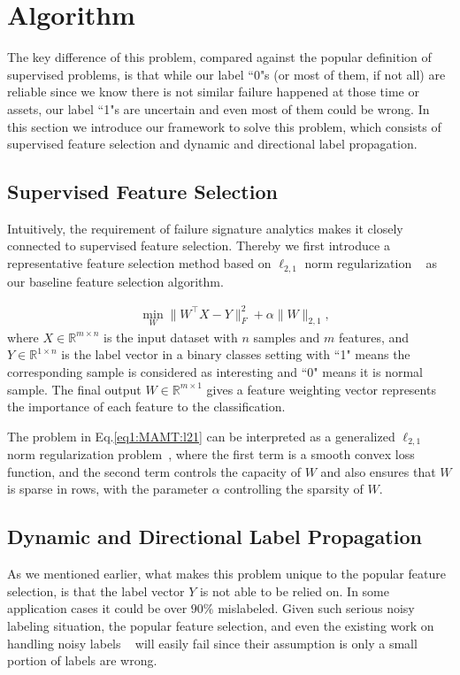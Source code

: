 \section{Algorithm}
\label{sec:MAMT:alg}

The key difference of this problem, compared against the popular definition of supervised problems, is that while our label ``0"s (or most of them, if not all) are reliable since we know there is not similar failure happened at those time or assets, our label ``1"s are uncertain and even most of them could be wrong. In this section we introduce our framework to solve this problem, which consists of supervised feature selection and dynamic and directional label propagation. 

\subsection{Supervised Feature Selection}
\label{sec:MAMT:alg:fea_sel} 
Intuitively, the requirement of failure signature analytics makes it closely connected to supervised feature selection. Thereby we first introduce a representative feature selection method based on  $\ell_{2,1}$ norm regularization ~\cite{liu2009multi} as our baseline feature selection algorithm. 

\begin{align}
\label{eq1:MAMT:l21}
& \min_{W} \| W^\top X - Y\|_F^2 + \alpha\|W\|_{2,1}, 
\end{align}
where $X \in \mathbb{R}^{m \times n}$ is the input dataset with $n$ samples and $m$ features, and $Y \in \mathbb{R}^{1 \times n}$ is the label vector in a binary classes setting with ``1" means the corresponding sample is considered as interesting and ``0" means it is normal sample. The final output $W \in \mathbb{R}^{m \times 1}$ gives a feature weighting vector represents the importance of each feature to the classification. 

The problem in Eq.\ref{eq1:MAMT:l21} can be interpreted as a generalized $\ell_{2,1}$ norm regularization problem~\cite{liu2009multi}, where the first term is a smooth convex loss function, and the second term controls the capacity of $W$ and also ensures that $W$ is sparse in rows, with the parameter $\alpha$ controlling the sparsity of $W$.   

\subsection{Dynamic and Directional Label Propagation}
\label{sec:MAMT:alg:lbl_ppg} 
As we mentioned earlier, what makes this problem unique to the popular feature selection, is that the label vector $Y$  is not able to be relied on. In some application cases it could be over $90\%$ mislabeled. Given such serious noisy labeling situation, the popular feature selection, and even the existing work on handling noisy labels ~\cite{tang2013coselect, frenay2014estimating} will easily fail since their assumption is only a small portion of labels are wrong. 

